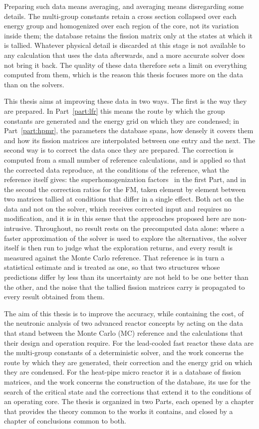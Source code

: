 Preparing such data means averaging, and averaging means disregarding some
details. The
multi-group constants retain a cross section collapsed over each energy group
and homogenized over each region of the core, not its variation inside them; the
database retains the fission matrix only at the states at which it is tallied. Whatever physical detail is discarded at
this stage is not available to any calculation that uses the data afterwards,
and a more accurate solver does not bring it back. The quality of these data
therefore sets a limit on everything computed from them, which is the reason
this thesis focuses more on the data than on the solvers.

This thesis aims at improving these data in two ways. The first is the way they are
prepared. In Part~\ref{part:lfr} this means the route by which the group
constants are generated and the energy grid on which they are condensed; in
Part~\ref{part:hpmr}, the parameters the database spans, how densely it covers
them and how its fission matrices are interpolated between one entry and the next. The
second way is to correct the data once they are prepared. The correction is
computed from a small number of reference calculations, and is applied so that
the corrected data reproduce, at the conditions of the reference, what the
reference itself gives: the superhomogenization factors~\cite{Hbert_1980} in the
first Part, and in the second the correction ratios for the FM, taken element by element
between two matrices tallied at conditions that differ in a single effect. Both act on the
data and not on the solver, which receives corrected input and requires no
modification, and it is in this sense that the approaches proposed here are
non-intrusive. Throughout, no result rests on the precomputed data alone: where
a faster approximation of the solver is used to explore the alternatives, the
solver itself is then run to judge what the exploration returns, and every
result is measured against the Monte Carlo reference. That reference is in turn a
statistical estimate and is treated as one, so that two structures whose
predictions differ by less than its uncertainty are not held to be one better
than the other, and the noise that the tallied fission matrices carry is
propagated to every result obtained from them.

The aim of this thesis is to improve the accuracy, while containing the cost, of
the neutronic analysis of two advanced reactor concepts by acting on the data
that stand between the Monte Carlo (MC) reference and the
calculations that their design and operation require. For the lead-cooled fast
reactor these data are the multi-group constants of a deterministic solver,
and the work concerns the route by which they are generated, their
correction and the energy grid on which they are condensed. For the heat-pipe
micro reactor it is a database of fission matrices, and the work concerns the
construction of the database, its use for the search of the critical state and
the corrections that extend it to the conditions of an operating core. The
thesis is organized in two Parts, each opened by a chapter that provides the
theory common to the works it contains, and closed by a chapter of conclusions
common to both.

